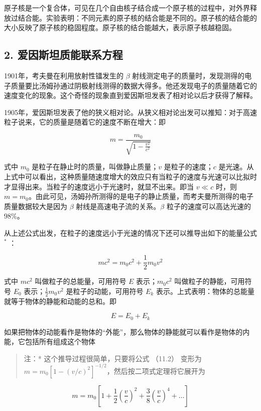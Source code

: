 原子核是一个复合体，可见在几个自由核子结合成一个原子核的过程中，对外界释放过结合能。实验表明：不同元素的原子核的结合能是不同的。原子核的结合能的大小反映了原子核的稳固程度。原子核的结合能越大，表示原子核越稳固。

\subsection{2.
爱因斯坦质能联系方程}

1901年，考夫曼在利用放射性镭发生的 \(\beta\)
射线测定电子的质量时，发现测得的电子质量要比汤姆孙通过阴极射线测得的数据大得多。他还发现电子的质量随着它的速度变化的现象。这个奇怪的现象直到爱因斯坦发表了相对论以后才获得了解释。

1905年，爱因斯坦发表了他的狭义相对论。从狭义相对论出发可以推知：对于高速粒子说来，它的质量是随着它的速度不断在增大：即

\[
m = \frac {m _ {0}}{\sqrt {1 - \frac {v ^ {2}}{c ^ {2}}}} \tag {11.1}
\]

式中 \(m_0\) 是粒子在静止时的质量，叫做静止质量；\(v\)
是粒子的速度；\(c\)
是光速。从上式中可以看出，这种质量随速度增大的效应只有当粒子的速度与光速可以比拟时才显得出来。当粒子的速度远小于光速时，就显不出来。即当
\(v \ll c\) 时，则
\(m = m_0\)。由此可见，汤姆孙所测得的是电子的静止质量，而考夫曼所测得的电子质量数据较大是因为
\(\beta\) 射线是高速电子流的关系。\(\beta\) 粒子的速度可以高达光速的
\(98\%\)。

从上述公式出发，在粒子的速度远小于光速的情况下还可以推导出如下的能量公式
\(^{*}\) ：

\[
m c ^ {2} = m _ {0} c ^ {2} + \frac {1}{2} m _ {0} v ^ {2} \tag {11.2}
\]

式中 \(mc^2\) 叫做粒子的总能量，可用符号 \(E\) 表示；\(m_0c^2\)
叫做粒子的静能，可用符号 \(E_0\) 表示；\(\frac{1}{2} m_0v^2\)
是粒子的动能，可用符号 \(E_k\)
表示。上式表明：物体的总能量就等于物体的静能和动能的总和。即

\[
E = E _ {0} + E _ {k} \tag {11.3}
\]

如果把物体的动能看作是物体的``外能''，那么物体的静能就可以看作是物体的内能，它包括所有组成这个物体

\begin{quote}
注：* 这个推导过程很简单，只要将公式 （11.2） 变形为
\(m = m_0[1 - (v/c)^2]^{-1/2}\)，然后按二项式定理将它展开为
\end{quote}

\[
m = m _ {0} \left[ 1 + \frac {1}{2} \left(\frac {v}{c}\right) ^ {2} + \frac {3}{8} \left(\frac {v}{c}\right) ^ {4} + \dots \right]
\]


